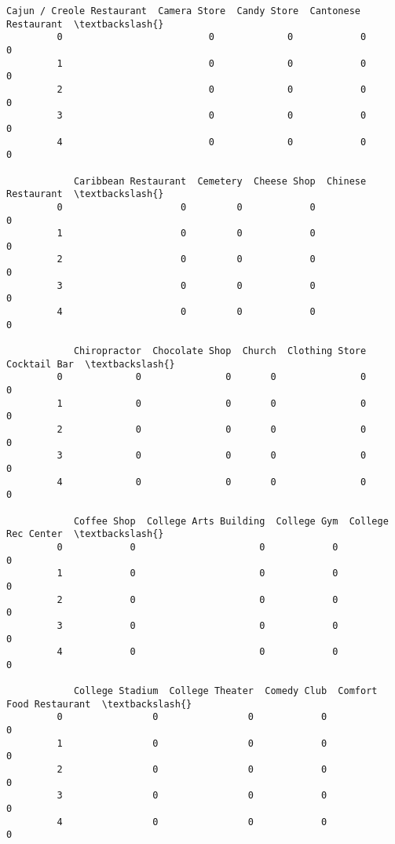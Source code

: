 \documentclass[11pt]{article}
\begin{document}
\begin{Verbatim}[commandchars=\\\{\}]
            Cajun / Creole Restaurant  Camera Store  Candy Store  Cantonese Restaurant  \textbackslash{}
         0                          0             0            0                     0   
         1                          0             0            0                     0   
         2                          0             0            0                     0   
         3                          0             0            0                     0   
         4                          0             0            0                     0   
         
            Caribbean Restaurant  Cemetery  Cheese Shop  Chinese Restaurant  \textbackslash{}
         0                     0         0            0                   0   
         1                     0         0            0                   0   
         2                     0         0            0                   0   
         3                     0         0            0                   0   
         4                     0         0            0                   0   
         
            Chiropractor  Chocolate Shop  Church  Clothing Store  Cocktail Bar  \textbackslash{}
         0             0               0       0               0             0   
         1             0               0       0               0             0   
         2             0               0       0               0             0   
         3             0               0       0               0             0   
         4             0               0       0               0             0   
         
            Coffee Shop  College Arts Building  College Gym  College Rec Center  \textbackslash{}
         0            0                      0            0                   0   
         1            0                      0            0                   0   
         2            0                      0            0                   0   
         3            0                      0            0                   0   
         4            0                      0            0                   0   
         
            College Stadium  College Theater  Comedy Club  Comfort Food Restaurant  \textbackslash{}
         0                0                0            0                        0   
         1                0                0            0                        0   
         2                0                0            0                        0   
         3                0                0            0                        0   
         4                0                0            0                        0   
         

\end{Verbatim}
\end{document}
